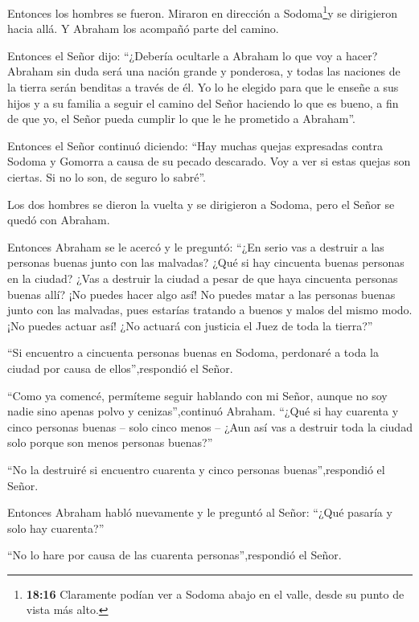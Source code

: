  Entonces los hombres se fueron. Miraron en dirección a
Sodoma\footnote{\textbf{18:16} Claramente podían ver a Sodoma abajo en
  el valle, desde su punto de vista más alto.}y se dirigieron hacia
allá. Y Abraham los acompañó parte del camino.

 Entonces el Señor dijo: ``¿Debería ocultarle a Abraham lo
que voy a hacer?  Abraham sin duda será una nación grande y
ponderosa, y todas las naciones de la tierra serán benditas a través de
él.  Yo lo he elegido para que le enseñe a sus hijos y a su
familia a seguir el camino del Señor haciendo lo que es bueno, a fin de
que yo, el Señor pueda cumplir lo que le he prometido a Abraham''.

 Entonces el Señor continuó diciendo: ``Hay muchas quejas
expresadas contra Sodoma y Gomorra a causa de su pecado descarado.
 Voy a ver si estas quejas son ciertas. Si no lo son, de
seguro lo sabré''.

 Los dos hombres se dieron la vuelta y se dirigieron a
Sodoma, pero el Señor se quedó con Abraham.

 Entonces Abraham se le acercó y le preguntó: ``¿En serio
vas a destruir a las personas buenas junto con las malvadas?
 ¿Qué si hay cincuenta buenas personas en la ciudad? ¿Vas a
destruir la ciudad a pesar de que haya cincuenta personas buenas allí?
 ¡No puedes hacer algo así! No puedes matar a las personas
buenas junto con las malvadas, pues estarías tratando a buenos y malos
del mismo modo. ¡No puedes actuar así! ¿No actuará con justicia el Juez
de toda la tierra?''

 ``Si encuentro a cincuenta personas buenas en Sodoma,
perdonaré a toda la ciudad por causa de ellos'',respondió el Señor.

 ``Como ya comencé, permíteme seguir hablando con mi Señor,
aunque no soy nadie sino apenas polvo y cenizas'',continuó Abraham.
 ``¿Qué si hay cuarenta y cinco personas buenas -- solo
cinco menos -- ¿Aun así vas a destruir toda la ciudad solo porque son
menos personas buenas?''

``No la destruiré si encuentro cuarenta y cinco personas
buenas'',respondió el Señor.

 Entonces Abraham habló nuevamente y le preguntó al Señor:
``¿Qué pasaría y solo hay cuarenta?''

``No lo hare por causa de las cuarenta personas'',respondió el Señor.

